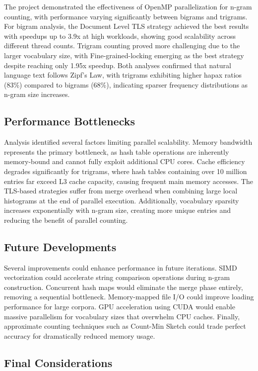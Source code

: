 \documentclass[10pt,twocolumn,letterpaper]{article}
\begin{document}
The project demonstrated the effectiveness of OpenMP parallelization for n-gram counting, with performance varying significantly between bigrams and trigrams. For bigram analysis, the Document Level TLS strategy achieved the best results with speedups up to 3.9x at high workloads, showing good scalability across different thread counts. Trigram counting proved more challenging due to the larger vocabulary size, with Fine-grained-locking emerging as the best strategy despite reaching only 1.95x speedup. Both analyses confirmed that natural language text follows Zipf's Law, with trigrams exhibiting higher hapax ratios (83\%) compared to bigrams (68\%), indicating sparser frequency distributions as n-gram size increases.

\subsection{Performance Bottlenecks}

Analysis identified several factors limiting parallel scalability. Memory bandwidth represents the primary bottleneck, as hash table operations are inherently memory-bound and cannot fully exploit additional CPU cores. Cache efficiency degrades significantly for trigrams, where hash tables containing over 10 million entries far exceed L3 cache capacity, causing frequent main memory accesses. The TLS-based strategies suffer from merge overhead when combining large local histograms at the end of parallel execution. Additionally, vocabulary sparsity increases exponentially with n-gram size, creating more unique entries and reducing the benefit of parallel counting.

\subsection{Future Developments}

Several improvements could enhance performance in future iterations. SIMD vectorization could accelerate string comparison operations during n-gram construction. Concurrent hash maps would eliminate the merge phase entirely, removing a sequential bottleneck. Memory-mapped file I/O could improve loading performance for large corpora. GPU acceleration using CUDA would enable massive parallelism for vocabulary sizes that overwhelm CPU caches. Finally, approximate counting techniques such as Count-Min Sketch could trade perfect accuracy for dramatically reduced memory usage.

\subsection{Final Considerations}
\end{document}
